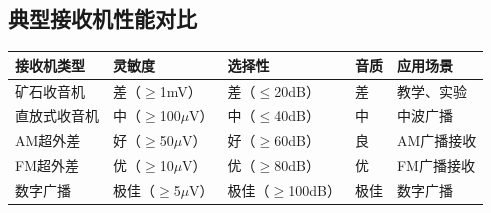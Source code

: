 \subsection{典型接收机性能对比}
\label{sec:receiver_comparison}

\begin{center}
\begin{tabular}{|p{3cm}|p{3cm}|p{3cm}|p{3cm}|p{3cm}|}
\hline
\textbf{接收机类型} & \textbf{灵敏度} & \textbf{选择性} & \textbf{音质} & \textbf{应用场景} \\
\hline
矿石收音机 & 差（$\geq$1mV） & 差（$\leq$20dB） & 差 & 教学、实验 \\
直放式收音机 & 中（$\geq$100$\mu$V） & 中（$\leq$40dB） & 中 & 中波广播 \\
AM超外差 & 好（$\geq$50$\mu$V） & 好（$\geq$60dB） & 良 & AM广播接收 \\
FM超外差 & 优（$\geq$10$\mu$V） & 优（$\geq$80dB） & 优 & FM广播接收 \\
数字广播 & 极佳（$\geq$5$\mu$V） & 极佳（$\geq$100dB） & 极佳 & 数字广播 \\
\hline
\end{tabular}
\end{center}
